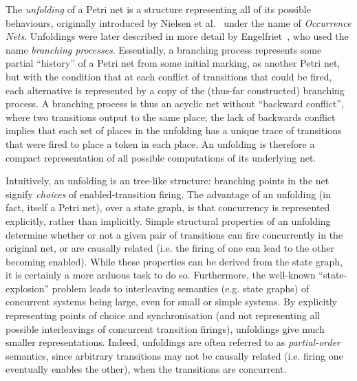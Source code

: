 
The \emph{unfolding} of a Petri net is a structure representing all of its
possible behaviours, originally introduced by {Nielsen et
al.}~\cite{Nielsen1981} under the name of \emph{Occurrence Nets}. Unfoldings
were later described in more detail by Engelfriet~\cite{Engelfriet1991}, who
used the name \emph{branching processes}. Essentially, a branching process
represents some partial ``history'' of a Petri net from some initial marking,
as another Petri net, but with the condition that at each conflict of
transitions that could be fired, each alternative is represented by a copy of
the (thus-far constructed) branching process. A branching process is thus an
acyclic net without ``backward conflict'', where two transitions output to the
same place; the lack of backwards conflict implies that each set of places in
the unfolding has a unique trace of transitions that were fired to place a
token in each place. An unfolding is therefore a compact representation of all
possible computations of its underlying net.

Intuitively, an unfolding is an tree-like structure: branching points in the
net signify \emph{choices} of enabled-transition firing. The advantage of an
unfolding (in fact, itself a Petri net), over a state graph, is that
concurrency is represented explicitly, rather than implicitly. Simple
structural properties of an unfolding determine whether or not a given pair of
transitions can fire concurrently in the original net, or are causally related
(i.e. the firing of one can lead to the other becoming enabled). While these
properties can be derived from the state graph, it is certainly a more arduous
task to do so. Furthermore, the well-known ``state-explosion'' problem leads to
interleaving semantics (e.g. state graphs) of concurrent systems being large,
even for small or simple systems. By explicitly representing points of choice
and synchronisation (and not representing all possible interleavings of
concurrent transition firings), unfoldings give much smaller representations.
Indeed, unfoldings are often referred to as \emph{partial-order} semantics,
since arbitrary transitions may not be causally related (i.e. firing one
eventually enables the other), when the transitions are concurrent.

